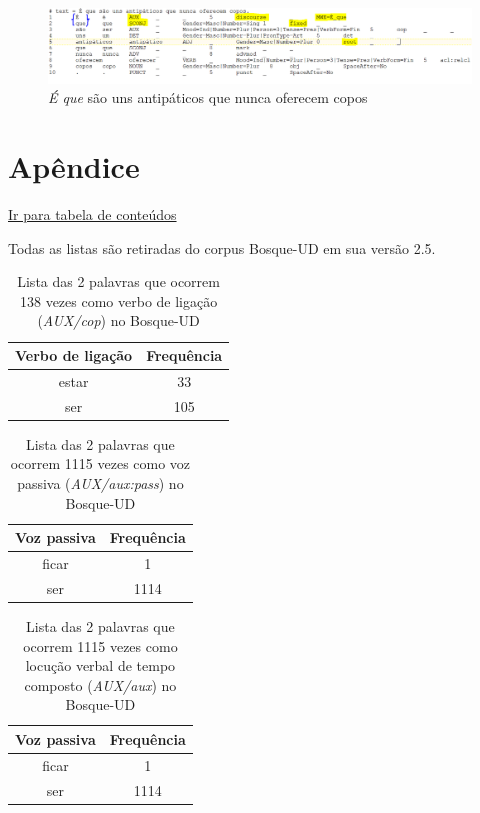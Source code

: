 \documentclass[output=paper,colorlinks,citecolor=brown]{langscibook}
\begin{document}
	\begin{figure}
    	\centering
    	\includegraphics[width=\textwidth,height=\textheight,keepaspectratio]{imagesDrive/image71.PNG}
    	\caption{\emph{É que} são uns antipáticos que nunca oferecem copos}
    	\label{fig:equeMWE3}
    	\end{figure}{}

\chapter*{Apêndice}

	\hyperlink{toc}{Ir para tabela de conteúdos\\}

	Todas as listas são retiradas do corpus Bosque-UD em sua versão 2.5.
	
	\begin{table}[]
		\centering
		\begin{tabular}{|c|c|}
			\hline
			\textbf{Verbo de ligação} & \textbf{Frequência} \\\hline
			estar & 33\\\hline
			ser & 105\\\hline
		\end{tabular}
		\caption{Lista das 2 palavras que ocorrem 138 vezes como verbo de ligação (\emph{AUX/cop}) no Bosque-UD}
		\label{tab:verbosdeligacao}
	\end{table}

	\begin{table}[]
		\centering
		\begin{tabular}{|c|c|}
			\hline
			\textbf{Voz passiva} & \textbf{Frequência} \\\hline
			ficar & 1\\\hline
			ser & 1114\\\hline
		\end{tabular}
		\caption{Lista das 2 palavras que ocorrem 1115 vezes como voz passiva (\emph{AUX/aux:pass}) no Bosque-UD}
		\label{tab:vozpassiva}
	\end{table}

	\begin{table}[]
		\centering
		\begin{tabular}{|c|c|}
			\hline
			\textbf{Voz passiva} & \textbf{Frequência} \\\hline
			ficar & 1\\\hline
			ser & 1114\\\hline
		\end{tabular}
		\caption{Lista das 2 palavras que ocorrem 1115 vezes como locução verbal de tempo composto (\emph{AUX/aux}) no Bosque-UD}
		\label{tab:loctempocomposto}
	\end{table}
\end{document}
